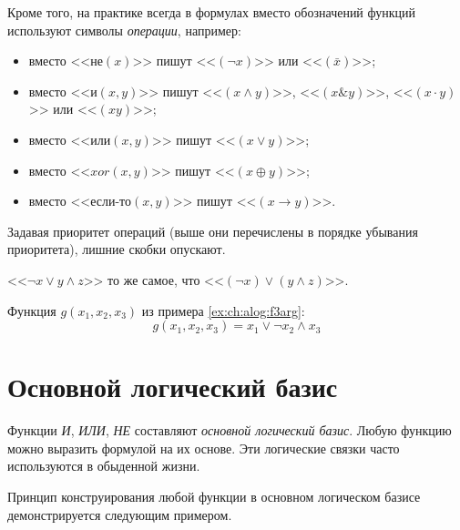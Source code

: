 Кроме того, на практике всегда в формулах вместо обозначений функций используют символы \emph{операции}, например:
\begin{itemize}
    \item вместо <<$\textit{не}(x)$>> пишут <<$(\lnot x)$>> или <<$(\bar{x})$>>;
    \item вместо <<$\textit{и}(x,y)$>> пишут <<$(x \land y)$>>, <<$(x \& y)$>>,  <<$(x \cdot y)$>> или  <<$(xy)$>>;
    \item вместо <<$\textit{или}(x,y)$>> пишут <<$(x \lor y)$>>;
    \item вместо <<$\textit{xor}(x,y)$>> пишут <<$(x \oplus y)$>>;
    \item вместо <<$\textit{если-то}(x,y)$>> пишут <<$(x \to y)$>>.
\end{itemize}

Задавая приоритет операций (выше они перечислены в порядке убывания приоритета), лишние скобки опускают.
\begin{exampl} 
    <<$\lnot x\lor y\land z$>> то же самое, что <<$(\lnot x)\lor (y\land z)$>>.
\end{exampl}

\begin{exampl}
    Функция $g(x_1,x_2,x_3)$ из примера \ref{ex:ch:alog:f3arg}:
    \[
        g(x_1,x_2,x_3) = x_1 \lor \lnot x_2 \land x_3
    \]
\end{exampl}


\section{Основной логический базис}

Функции \emph{И}, \emph{ИЛИ}, \emph{НЕ} составляют \emph{основной логический базис}. Любую функцию можно выразить формулой на их основе. Эти логические связки часто используются в обыденной жизни.

Принцип конструирования любой функции в основном логическом базисе демонстрируется следующим примером.

